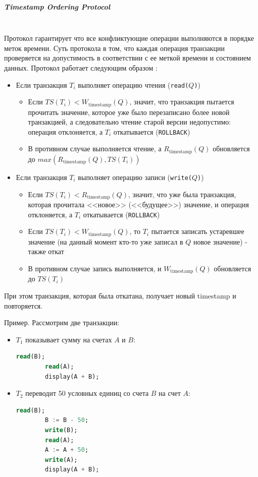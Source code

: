 \subparagraph{Timestamp Ordering Protocol} ~\\

Протокол гарантирует что все конфликтующие операции выполняются в порядке меток времени. Суть протокола в том, что каждая операция транзакции проверяется на допустимость в соответствии с ее меткой времени и состоянием данных. Протокол работает следующим образом \autocite{Silberschatz}:

\begin{itemize}
    \item Если транзакция $T_i$ выполняет операцию чтения (\texttt{read($Q$)})
    \begin{itemize}
        \item Если $TS(T_i) < W_{\text{timestamp}}(Q)$, значит, что транзакция пытается прочитать значение, которое уже было перезаписано более новой транзакцией, а следовательно чтение старой версии недопустимо: операция отклоняется, а $T_i$ откатывается (\texttt{ROLLBACK})
        \item В противном случае выполняется чтение, а $R_{\text{timestamp}}(Q)$ обновляется до $max(R_{\text{timestamp}}(Q), TS(T_i))$
    \end{itemize}

    \item Если транзакция $T_i$ выполняет операцию записи (\texttt{write($Q$)})
    \begin{itemize}
        \item Если $TS(T_i) < R_{\text{timestamp}}(Q)$, значит, что уже была транзакция, которая прочитала <<новое>> (<<будущее>>) значение, и операция отклоняется, а $T_i$ откатывается (\texttt{ROLLBACK})
        \item Если $TS(T_i) < W_{\text{timestamp}}(Q)$, то $T_i$ пытается записать устаревшее значение (на данный момент кто-то уже записал в $Q$ новое значение) - также откат
        \item В противном случае запись выполняется, и $W_{\text{timestamp}}(Q)$ обновляется до $TS(T_i)$ 
    \end{itemize}
\end{itemize}

При этом транзакция, которая была откатана, получает новый timestamp и повторяется.

Пример. Рассмотрим две транзакции:
\begin{itemize}
    \item $T_1$ показывает сумму на счетах $A$ и $B$:
    \begin{lstlisting}[language=SQL]
        read(B);
        read(A);
        display(A + B);           
    \end{lstlisting}

    \item $T_2$ переводит 50 условных единиц со счета $B$ на счет $A$:
    \begin{lstlisting}[language=SQL]
        read(B);
        B := B - 50;
        write(B);
        read(A);
        A := A + 50;
        write(A);
        display(A + B);               
    \end{lstlisting}
\end{itemize}

